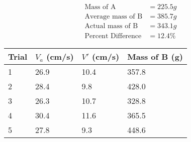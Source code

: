 \begin{equation*}
    \begin{aligned}
        \text{Mass of A}&=225.5g \\
        \text{Average mass of B}&=385.7g \\
        \text{Actual mass of B}&=343.1g \\
        \text{Percent Difference}&=12.4\%
    \end{aligned}    
\end{equation*}
\begin{table}[H]
    \begin{tabular}{|l|l|l|l|}
    \hline
    Trial & $V_a$ (cm/s) & $V'$ (cm/s) & Mass of B (g) \\ \hline
    1     & 26.9        & 10.4      & 357.8         \\ \hline
    2     & 28.4        & 9.8       & 428.0         \\ \hline
    3     & 26.3        & 10.7      & 328.8         \\ \hline
    4     & 30.4        & 11.6      & 365.5         \\ \hline
    5     & 27.8        & 9.3       & 448.6         \\ \hline
    \end{tabular}
    \end{table}
    